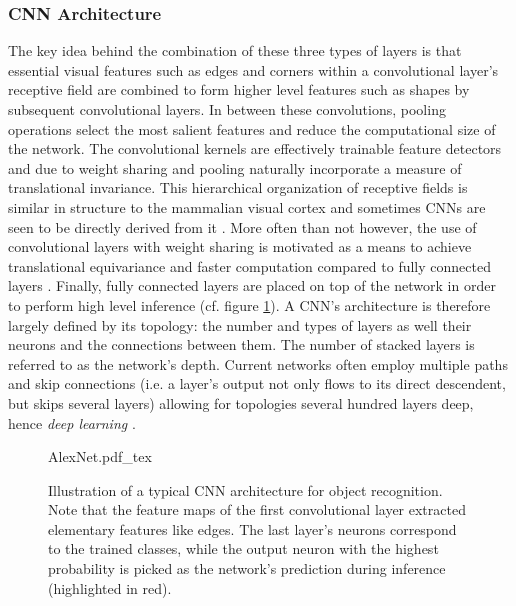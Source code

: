 \subsubsection{CNN Architecture}
The key idea behind the combination of these three types of layers is that essential visual features such as edges and corners within a convolutional layer's receptive field are combined to form higher level features such as shapes by subsequent convolutional layers. In between these convolutions, pooling operations select the most salient features and reduce the computational size of the network. The convolutional kernels are effectively trainable feature detectors and due to weight sharing and pooling naturally incorporate a measure of translational invariance. This hierarchical organization of receptive fields is similar in structure to the mammalian visual cortex \cite{cat-brain} and sometimes CNNs are seen to be directly derived from it \cite{Fukushima1980,lecun2015deep}. More often than not however, the use of convolutional layers with weight sharing is motivated as a means to achieve translational equivariance and faster computation compared to fully connected layers \cite{Goodfellow-et-al-2016,7298668,7298594}. Finally, fully connected layers are placed on top of the network in order to perform high level inference (cf. figure \ref{fig:cnn-arch}). A CNN's architecture is therefore largely defined by its topology: the number and types of layers as well their neurons and the connections between them. The number of stacked layers is referred to as the network's depth. Current networks often employ multiple paths and skip connections (i.e. a layer's output not only flows to its direct descendent, but skips several layers) allowing for topologies several hundred layers deep, hence \emph{deep learning} \cite{huang2017densely,szegedy2017inception,xie2017aggregated,wang2015towards}.
\begin{figure}
    \centering
\def\svgwidth{\textwidth}
{AlexNet.pdf_tex}
\caption[Illustration of a typical CNN architecture]{Illustration of a typical CNN architecture for object recognition. Note that the feature maps of the first convolutional layer extracted elementary features like edges. The last layer's neurons correspond to the trained classes, while the output neuron with the highest probability is picked as the network's prediction during inference (highlighted in red).}\label{fig:cnn-arch}
\end{figure}\noindent
